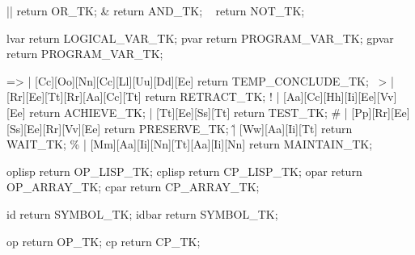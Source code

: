 ||                {return OR_TK;}
&                {return AND_TK;}
~                {return NOT_TK;}

{lvar}           {return LOGICAL_VAR_TK;}
{pvar}           {return PROGRAM_VAR_TK;}
{gpvar}          {return PROGRAM_VAR_TK;}

=>        |
[Cc][Oo][Nn][Cc][Ll][Uu][Dd][Ee]        
        {return TEMP_CONCLUDE_TK;}
~>        |
[Rr][Ee][Tt][Rr][Aa][Cc][Tt]                 
        {return RETRACT_TK;}
!        |
[Aa][Cc][Hh][Ii][Ee][Vv][Ee]                 
        {return ACHIEVE_TK;}
\?        |
[Tt][Ee][Ss][Tt]                         
        {return TEST_TK;}
#        |
[Pp][Rr][Ee][Ss][Ee][Rr][Vv][Ee]        
        {return PRESERVE_TK;}
\^        |
[Ww][Aa][Ii][Tt]                         
        {return WAIT_TK;}
\%        |
[Mm][Aa][Ii][Nn][Tt][Aa][Ii][Nn]        
        {return MAINTAIN_TK;}

{oplisp}   {return OP_LISP_TK;}
{cplisp}   {return CP_LISP_TK;}
{opar}     {return OP_ARRAY_TK;}
{cpar}     {return CP_ARRAY_TK;}

{id}       {return SYMBOL_TK;}
{idbar}    {return SYMBOL_TK;}

{op}       {return OP_TK;}
{cp}       {return CP_TK;}
